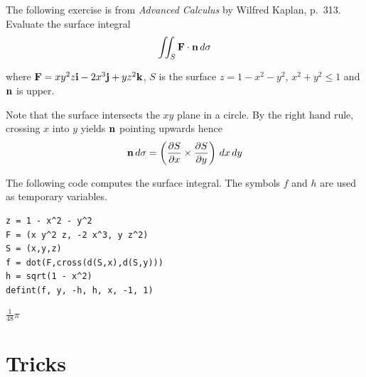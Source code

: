 \documentclass[12pt]{article}
\begin{document}
\bigskip
The following exercise is from
{\it Advanced Calculus} by Wilfred Kaplan, p.~313.
Evaluate the surface integral
$$\int\!\!\!\int_S{\bf F\cdot n}\,d\sigma$$

where ${\bf F}=xy^2z{\bf i}-2x^3{\bf j}+yz^2{\bf k}$, $S$ is the surface
$z=1-x^2-y^2$, $x^2+y^2\le1$ and $\bf n$ is upper.

\bigskip
Note that the surface intersects the $xy$ plane in a circle.
By the right hand rule, crossing $x$ into $y$ yields $\bf n$ pointing upwards hence
$${\bf n}\,d\sigma=\left({\frac{\partial S}{\partial x}\times\frac{\partial S}{\partial y}}\right)\,dx\,dy$$

The following code computes the surface integral.
The symbols $f$ and $h$ are used as temporary variables.

{\color{blue}
\begin{verbatim}
z = 1 - x^2 - y^2
F = (x y^2 z, -2 x^3, y z^2)
S = (x,y,z)
f = dot(F,cross(d(S,x),d(S,y)))
h = sqrt(1 - x^2)
defint(f, y, -h, h, x, -1, 1)
\end{verbatim}
}

$\displaystyle \tfrac{1}{48}\pi$

\newpage

\section{Tricks}
\end{document}
